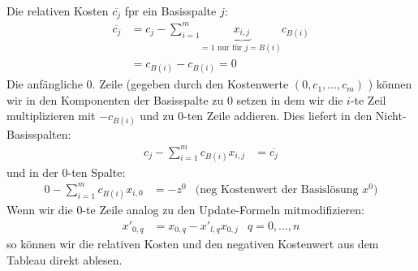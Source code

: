 Die relativen Kosten $\overline{c_j}$ fpr ein Basisspalte $j$:
\begin{align*}
\overline{c_j} &= c_j - \sum_{i=1}^m \underbrace{x_{i,j}}_{\text{= 1 nur für $j=B(i)$}} c_{B(i)} \\
&= c_{B(i)} - c_{B(i)} = 0
\end{align*}
Die anfängliche $0$. Zeile (gegeben durch den Kostenwerte $(0,c_1,\dotsc,c_m)$ ) können wir in den Komponenten der Basisspalte zu $0$ setzen in dem wir die $i$-te Zeil multiplizieren mit $-c_{B(i)}$ und zu $0$-ten Zeile addieren.
Dies liefert in den Nicht-Basisspalten:
\begin{align*}
c_j - \sum_{i=1}^m c_{B(i)} x_{i,j} &= \overline{c_j}
\end{align*}
und in der $0$-ten Spalte:
\begin{align*}
0 - \sum_{i=1}^m c_{B(i)} x_{i,0} &= -z^0 &\text{(neg Kostenwert der Basislösung $x^0$)}
\end{align*}
Wenn wir die $0$-te Zeile analog zu den Update-Formeln mitmodifizieren:
\begin{align*}
x'_{0,q} &= x_{0,q} - x'_{l,q}x_{0,j} & q = 0,\dotsc,n
\end{align*}
so können wir die relativen Kosten und den negativen Kostenwert aus dem Tableau direkt ablesen.

